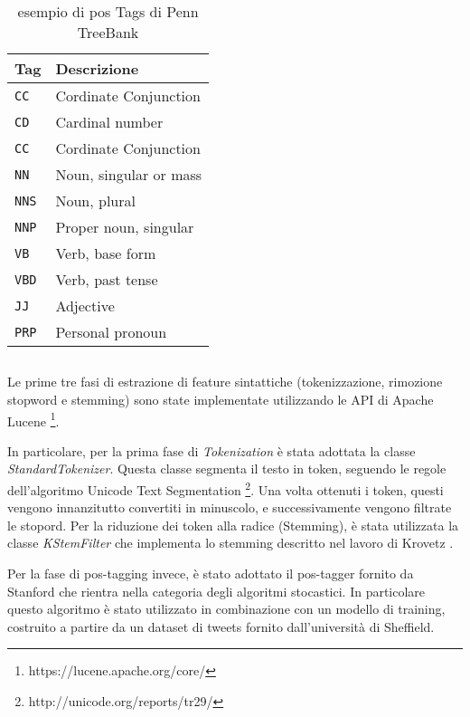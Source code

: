 \begin{table}[]
\centering
\caption{esempio di pos Tags di Penn TreeBank}
\label{tab:PosTags}
\begin{tabular}{ll}
\hline
 \textbf{Tag}& \textbf{Descrizione}\\ \hline
\texttt{CC}  & {Cordinate Conjunction}  \\ \hline
\texttt{CD}  & {Cardinal number}  \\ \hline
\texttt{CC}  & {Cordinate Conjunction}  \\ \hline
\texttt{NN}  & {Noun, singular or mass}  \\ \hline
\texttt{NNS}  & {Noun, plural}  \\ \hline
\texttt{NNP}  & {Proper noun, singular}  \\ \hline
\texttt{VB}  & {Verb, base form}  \\ \hline
\texttt{VBD}  & {Verb, past tense}  \\ \hline
\texttt{JJ}  & {Adjective}  \\ \hline
\texttt{PRP}  & {Personal pronoun}  \\ \hline
\end{tabular}
\end{table}
\subsection*{ }
Le prime tre fasi di estrazione di feature sintattiche (tokenizzazione, rimozione stopword e stemming) sono state implementate utilizzando le API di Apache Lucene \footnote{https://lucene.apache.org/core/}.

In particolare, per la prima fase di \emph{Tokenization}  è stata adottata la classe \emph{StandardTokenizer}. Questa classe segmenta il testo in token, seguendo le regole dell'algoritmo Unicode Text Segmentation \footnote{http://unicode.org/reports/tr29/}. 
Una volta ottenuti i token, questi vengono innanzitutto convertiti in minuscolo, e successivamente vengono filtrate le stopord.
Per la riduzione dei token alla radice (Stemming), è stata utilizzata la classe \emph{KStemFilter} che implementa lo stemming descritto nel lavoro di Krovetz \cite{Krovetz:1993:VMI:160688.160718}.

Per la fase di pos-tagging invece, è stato adottato il pos-tagger fornito da Stanford \cite{Toutanova:2000:EKS:1117794.1117802} che rientra nella categoria degli algoritmi stocastici. In particolare questo algoritmo è stato utilizzato in combinazione con un modello di training, costruito a partire da un dataset di tweets \cite{GateModelTagger} fornito dall'università di Sheffield.



